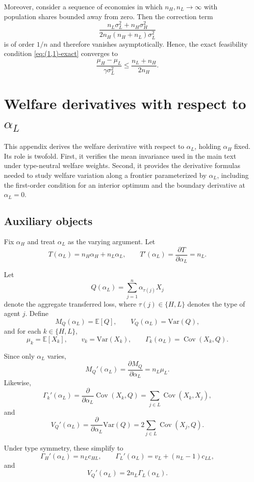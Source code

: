 \documentclass[a4paper,12pt]{article}
\theoremstyle{definition}
\theoremstyle{remark}
\DeclareMathOperator{\Cov}{Cov}
\newcommand{\E}{\mathbb{E}}
\newcommand{\Var}{\mathrm{Var}}
\newcommand{\1}{\mathbf{1}}
\begin{document}
Moreover, consider a sequence of economies in which \(n_H,n_L \to \infty\)
with population shares bounded away from zero. Then the correction term
\[
\frac{n_L\sigma_L^2 + n_H\sigma_H^2}
     {2 n_H (n_H+n_L)\sigma_L^2}
\]
is of order \(1/n\) and therefore vanishes asymptotically. Hence, the exact
feasibility condition \eqref{eq:(1,1)-exact} converges to
\[
    \frac{\mu_H - \mu_L}{\gamma \sigma_L^2}
    \le
    \frac{n_L + n_H}{2 n_H}.
\]


\section{Welfare derivatives with respect to \texorpdfstring{\(\alpha_L\)}{alphaL}}
\label{app:alphaL}

This appendix derives the welfare derivative with respect to \(\alpha_L\),
holding \(\alpha_H\) fixed. Its role is twofold. First, it verifies the mean
invariance used in the main text under type-neutral welfare weights. Second, it
provides the derivative formulas needed to study welfare variation along a
frontier parameterized by \(\alpha_L\), including the first-order condition for
an interior optimum and the boundary derivative at \(\alpha_L=0\).

\subsection{Auxiliary objects}
\label{app:alphaL-objects}

Fix \(\alpha_H\) and treat \(\alpha_L\) as the varying argument. Let
\[
T(\alpha_L)=n_H\alpha_H+n_L\alpha_L,
\qquad
T'(\alpha_L)=\frac{\partial T}{\partial \alpha_L}=n_L.
\]

Let
\[
Q(\alpha_L)=\sum_{j=1}^n \alpha_{\tau(j)}X_j
\]
denote the aggregate transferred loss, where \(\tau(j)\in\{H,L\}\) denotes the
type of agent \(j\). Define
\[
M_Q(\alpha_L)=\E[Q],
\qquad
V_Q(\alpha_L)=\Var(Q),
\]
and for each \(k\in\{H,L\}\),
\[
\mu_k=\E[X_k],
\qquad
v_k=\Var(X_k),
\qquad
\Gamma_k(\alpha_L)=\Cov(X_k,Q).
\]

Since only \(\alpha_L\) varies,
\[
M_Q'(\alpha_L)=\frac{\partial M_Q}{\partial \alpha_L}=n_L\mu_L.
\]
Likewise,
\[
\Gamma_k'(\alpha_L)
=
\frac{\partial}{\partial \alpha_L}\Cov(X_k,Q)
=
\sum_{j\in L}\Cov(X_k,X_j),
\]
and
\[
V_Q'(\alpha_L)
=
\frac{\partial}{\partial \alpha_L}\Var(Q)
=
2\sum_{j\in L}\Cov(X_j,Q).
\]

Under type symmetry, these simplify to
\[
\Gamma_H'(\alpha_L)=n_L c_{HL},
\qquad
\Gamma_L'(\alpha_L)=v_L+(n_L-1)c_{LL},
\]
and
\[
V_Q'(\alpha_L)=2n_L\Gamma_L(\alpha_L).
\]
\end{document}
